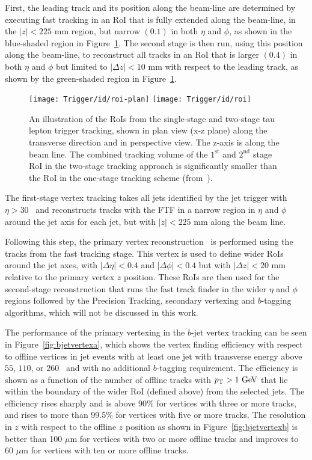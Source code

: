 					First, the leading track and its position along the beam-line are determined by executing fast tracking in an \ac{RoI} that is fully extended along the beam-line, in the $|z|<225$ mm region, but narrow $(0.1)$ in both $\eta$ and $\phi$, as shown in the blue-shaded region in Figure~\ref{fig:idroi}. The second stage is then run, using this position along the beam-line, to reconstruct all tracks in an \ac{RoI} that is larger $(0.4)$ in both $\eta$ and $\phi$ but limited to $|\Delta z|<10$ mm with respect to the leading track, as shown by the green-shaded region in Figure~\ref{fig:idroi}.

					\begin{figure}[!htb]
						\centering
						\texttt{[image: Trigger/id/roi-plan]}
						\texttt{[image: Trigger/id/roi]}
						\caption{An illustration of the \ac{RoI}s from the single-stage and two-stage tau lepton trigger tracking, shown in plan view (x-z plane) along the transverse direction and in perspective view. The z-axis is along the beam line. The combined tracking volume of the $1^{\mathrm{st}}$ and $2^{\mathrm{nd}}$ stage \ac{RoI} in the two-stage tracking approach is significantly smaller than the \ac{RoI} in the one-stage tracking scheme (from~\cite{ATLASTrigger2015}).}
						\label{fig:idroi}
					\end{figure}

					The first-stage vertex tracking takes all jets identified by the jet trigger with $\eta > 30$ \GeV\ and reconstructs tracks with the \ac{FTF} in a narrow region in $\eta$ and $\phi$ around the jet axis for each jet, but with $|z|<225$ mm along the beam line.
					
					Following this step, the primary vertex reconstruction~\cite{ATLAS-CONF-2010-069} is performed using the tracks from the fast tracking stage. This vertex is used to define wider \ac{RoI}s around
					the jet axes, with $|\Delta\eta|<0.4$ and $|\Delta\phi|<0.4$ but with $|\Delta z|<20$ mm relative to the primary vertex $z$ position. These \ac{RoI}s are then used for the second-stage 
					reconstruction that runs the fast track finder in the wider $\eta$ and $\phi$ regions followed by the Precision Tracking, secondary vertexing and $b$-tagging algorithms, which will not be discussed in this work.

					The performance of the primary vertexing in the $b$-jet vertex tracking can be seen in Figure~\ref{fig:bjetvertexa}, which shows the vertex finding efficiency with respect to 
					offline vertices in jet events with at least one jet with transverse energy above $55$, $110$, or $260$ \GeV\ and with no additional $b$-tagging requirement. The efficiency is shown 
					as a function of the number of offline tracks with $\pt>1 \GeV$ that lie within the boundary of the wider \ac{RoI} (defined above) from the selected jets. The efficiency rises sharply and 
					is above 90\% for vertices with three or more tracks, and rises to more than 99.5\% for vertices with five or more tracks. The resolution in $z$ with respect to the offline $z$ position as shown in Figure~\ref{fig:bjetvertexb} is better than 100 $\mu$m for vertices with two or more offline tracks and improves to 60 $\mu$m for vertices with ten or more offline tracks.

